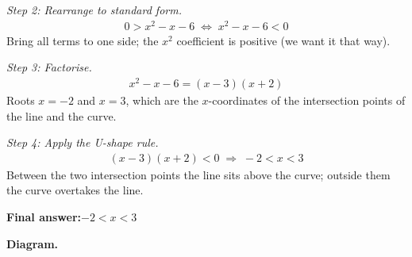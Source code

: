 \documentclass[11pt]{article}
\begin{document}
\textit{Step 2: Rearrange to standard form.}
\[\begin{gathered}
0 > x^2 - x - 6 \;\Longleftrightarrow\; x^2 - x - 6 < 0
\end{gathered}\]
Bring all terms to one side; the \( x^2 \) coefficient is positive (we want it that way).

\textit{Step 3: Factorise.}
\[\begin{gathered}
x^2 - x - 6 = (x - 3)(x + 2)
\end{gathered}\]
Roots \( x = -2 \) and \( x = 3 \), which are the \( x \)-coordinates of the intersection points of the line and the curve.

\textit{Step 4: Apply the U-shape rule.}
\[\begin{gathered}
(x - 3)(x + 2) < 0 \;\Longrightarrow\; -2 < x < 3
\end{gathered}\]
Between the two intersection points the line sits above the curve; outside them the curve overtakes the line.

\begin{answerbox}
\textbf{Final answer:}\quad \(\displaystyle -2 < x < 3\)
\end{answerbox}
\textbf{Diagram.}
\end{document}
